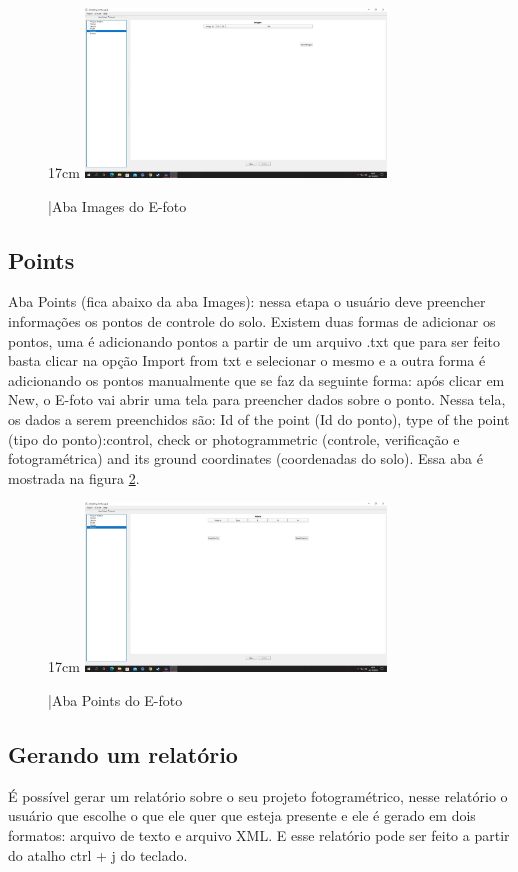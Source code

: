 \begin{figure}[!ht]{17cm}
	\includegraphics[width=8cm, center]{figuras/image.jpg}
	\caption{|Aba Images do E-foto} \label{fig:image}
\end{figure}

\subsection{Points}
Aba Points (fica abaixo da aba Images): nessa etapa o usuário deve preencher informações os pontos de controle do solo. Existem duas formas de adicionar os pontos, uma é adicionando pontos a partir de um arquivo .txt que para ser feito basta clicar na opção Import from txt e selecionar o mesmo e a outra forma é adicionando os pontos manualmente que se faz da seguinte forma: após clicar em New, o E-foto vai abrir uma tela para preencher dados sobre o ponto. Nessa tela, os dados a serem preenchidos são: Id of the point (Id do ponto), type of the point (tipo do ponto):control, check or photogrammetric (controle, verificação e fotogramétrica) and its ground coordinates (coordenadas do solo). Essa aba é mostrada na figura \ref{fig:points}. 

\begin{figure}[!ht]{17cm}
	\includegraphics[width=8cm, center]{figuras/points.jpg}
	\caption{|Aba Points do E-foto} \label{fig:points}
\end{figure}

\subsection{Gerando um relatório}
É possível gerar um relatório sobre o seu projeto fotogramétrico, nesse relatório o usuário que escolhe o que ele quer que esteja presente e ele é gerado em dois formatos: arquivo de texto e arquivo XML. E esse relatório pode ser feito a partir do atalho ctrl + j do teclado.


